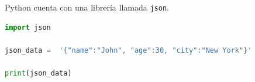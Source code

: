 Python cuenta con una librería llamada \texttt{json}.
\begin{lstlisting}[language=Python]
import json

json_data =  '{"name":"John", "age":30, "city":"New York"}'

print(json_data)
\end{lstlisting}





